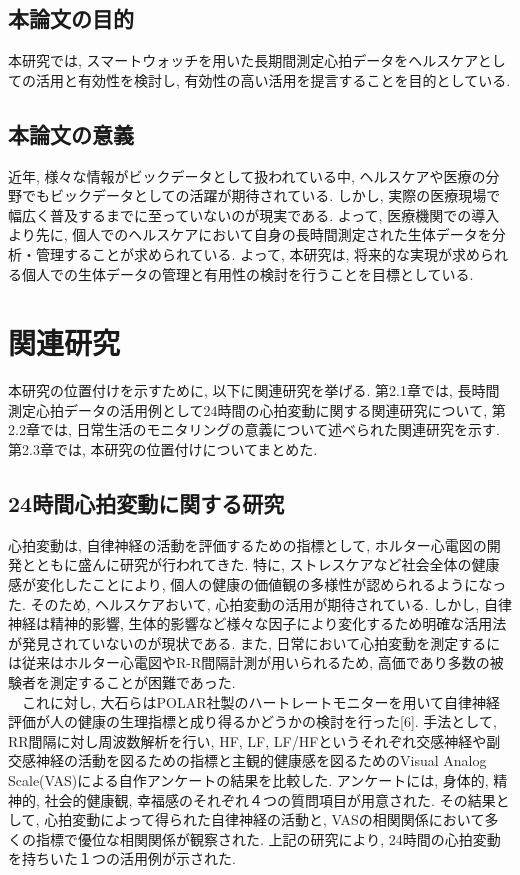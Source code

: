 \documentclass[report, 11pt, a4paper]{jsbook}
\begin{document}
\section{本論文の目的}
本研究では, スマートウォッチを用いた長期間測定心拍データをヘルスケアとしての活用と有効性を検討し, 有効性の高い活用を提言することを目的としている.  

\section{本論文の意義}
近年, 様々な情報がビックデータとして扱われている中, ヘルスケアや医療の分野でもビックデータとしての活躍が期待されている. しかし, 実際の医療現場で幅広く普及するまでに至っていないのが現実である. よって, 医療機関での導入より先に, 個人でのヘルスケアにおいて自身の長時間測定された生体データを分析・管理することが求められている.  
よって, 本研究は, 将来的な実現が求められる個人での生体データの管理と有用性の検討を行うことを目標としている. 


\chapter{関連研究}
本研究の位置付けを示すために, 以下に関連研究を挙げる. 第2.1章では, 長時間測定心拍データの活用例として24時間の心拍変動に関する関連研究について, 第2.2章では, 日常生活のモニタリングの意義について述べられた関連研究を示す. 第2.3章では, 本研究の位置付けについてまとめた.

\section{24時間心拍変動に関する研究}
心拍変動は, 自律神経の活動を評価するための指標として, ホルター心電図の開発とともに盛んに研究が行われてきた. 特に, ストレスケアなど社会全体の健康感が変化したことにより, 個人の健康の価値観の多様性が認められるようになった. そのため, ヘルスケアおいて, 心拍変動の活用が期待されている. しかし, 自律神経は精神的影響, 生体的影響など様々な因子により変化するため明確な活用法が発見されていないのが現状である. 
また, 日常において心拍変動を測定するには従来はホルター心電図やR-R間隔計測が用いられるため, 高価であり多数の被験者を測定することが困難であった.\\
　これに対し, 大石らはPOLAR社製のハートレートモニターを用いて自律神経評価が人の健康の生理指標と成り得るかどうかの検討を行った[6]. 手法として, RR間隔に対し周波数解析を行い, HF, LF, LF/HFというそれぞれ交感神経や副交感神経の活動を図るための指標と主観的健康感を図るためのVisual Analog Scale(VAS)による自作アンケートの結果を比較した. アンケートには, 身体的, 精神的, 社会的健康観, 幸福感のそれぞれ４つの質問項目が用意された. その結果として, 心拍変動によって得られた自律神経の活動と, VASの相関関係において多くの指標で優位な相関関係が観察された. 上記の研究により, 24時間の心拍変動を持ちいた１つの活用例が示された. 
	
\end{document}
